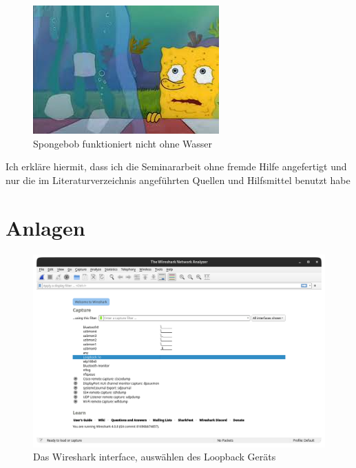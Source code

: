 \documentclass[12pt]{article}
\begin{document}
\begin{figure}[h]
	\centering
	\includegraphics[scale=0.5]{Bilder/Spongebob}
	\caption{Spongebob funktioniert nicht ohne Wasser\cite{spongebob}}
	\label{fig:figure99}
\end{figure}








\newpage
 \listoffigures
 \listoftables
\newpage



\newpage


\large{Ich erkläre hiermit, dass ich die Seminararbeit ohne fremde Hilfe angefertigt und nur die im Literaturverzeichnis angeführten Quellen und Hilfsmittel benutzt habe}
\newpage
\centering
\vspace*{200pt}
\Huge{\section{Anlagen}}
\newpage

\begin{figure}[h]
	\centering
	\includegraphics[scale=0.3]{Bilder/Anlagen_1}
	\caption{Das Wireshark interface, auswählen des Loopback Geräts \cite{screenshots-self}}
	\label{fig:figure30}
\end{figure}
\end{document}
